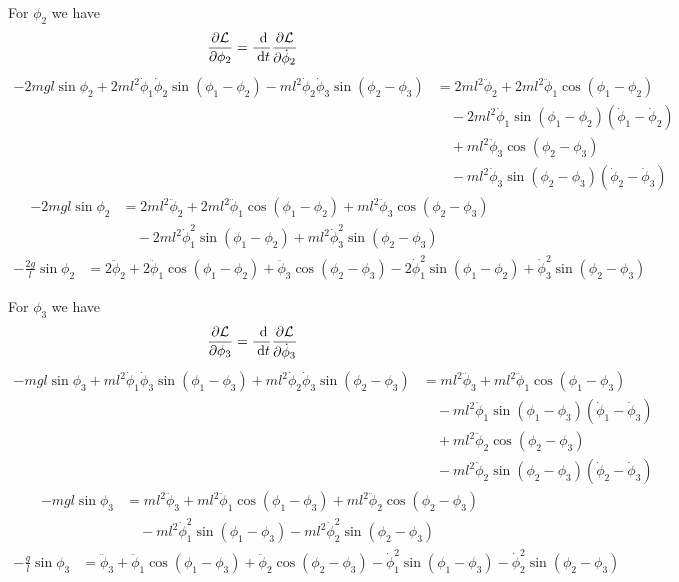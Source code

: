 \documentclass{article}
\renewcommand{\L}{\mathcal{L}}
\begin{document}
\begin{appendices}
For $\phi_2$ we have
\begin{align}
	\pD{\L}{\phi_2} &= \D{}{t}\pD{\L}{\dot\phi_2} 
\end{align}
\begin{align}
	-2mgl\sin\phi_2 +2ml^2\dot\phi_1\dot\phi_2\sin(\phi_1-\phi_2)
		-ml^2\dot\phi_2\dot\phi_3\sin(\phi_2-\phi_3)
	&= 2ml^2\ddot\phi_2 + 2ml^2\ddot\phi_1\cos(\phi_1-\phi_2) \\
	&\quad - 2ml^2\dot\phi_1\sin(\phi_1-\phi_2)(\dot\phi_1-\dot\phi_2) \\
	&\quad + ml^2\ddot\phi_3\cos(\phi_2-\phi_3) \\
	&\quad - ml^2\dot\phi_3\sin(\phi_2-\phi_3)(\dot\phi_2-\dot\phi_3) 
\end{align}
\begin{align}
	-2mgl\sin\phi_2 &= 2ml^2\ddot\phi_2 + 2ml^2\ddot\phi_1\cos(\phi_1-\phi_2)
		+ ml^2\ddot\phi_3\cos(\phi_2-\phi_3)  \\
		&\quad - 2ml^2\dot\phi_1^2\sin(\phi_1-\phi_2)
		+ ml^2\dot\phi_3^2\sin(\phi_2-\phi_3)
\end{align}
\begin{align}
	-\frac{2g}{l}\sin\phi_2 &= 2\ddot\phi_2 + 2\ddot\phi_1\cos(\phi_1-\phi_2)
		+ \ddot\phi_3\cos(\phi_2-\phi_3) - 2\dot\phi_1^2\sin(\phi_1-\phi_2)
		+ \dot\phi_3^2\sin(\phi_2-\phi_3)   \label{eq_m2}
\end{align}

For $\phi_3$ we have
\begin{align}
	\pD{\L}{\phi_3} &= \D{}{t}\pD{\L}{\dot\phi_3} 
\end{align}
\begin{align}
	-mgl\sin\phi_3 +ml^2\dot\phi_1\dot\phi_3\sin(\phi_1-\phi_3)
		+ml^2\dot\phi_2\dot\phi_3\sin(\phi_2-\phi_3)
	&= ml^2\ddot\phi_3 + ml^2\ddot\phi_1\cos(\phi_1-\phi_3) \\
	&\quad - ml^2\dot\phi_1\sin(\phi_1-\phi_3)(\dot\phi_1-\dot\phi_3) \\
	&\quad + ml^2\ddot\phi_2\cos(\phi_2-\phi_3) \\
	&\quad - ml^2\dot\phi_2\sin(\phi_2-\phi_3)(\dot\phi_2-\dot\phi_3) 
\end{align}
\begin{align}
	-mgl\sin\phi_3 &= ml^2\ddot\phi_3 + ml^2\ddot\phi_1\cos(\phi_1-\phi_3)
		+ ml^2\ddot\phi_2\cos(\phi_2-\phi_3)  \\
		&\quad - ml^2\dot\phi_1^2\sin(\phi_1-\phi_3)
		- ml^2\dot\phi_2^2\sin(\phi_2-\phi_3)
\end{align}
\begin{align}
	-\frac{g}{l}\sin\phi_3 &= \ddot\phi_3 + \ddot\phi_1\cos(\phi_1-\phi_3)
		+ \ddot\phi_2\cos(\phi_2-\phi_3) - \dot\phi_1^2\sin(\phi_1-\phi_3)
		- \dot\phi_2^2\sin(\phi_2-\phi_3)   \label{eq_m3}
\end{align}



\end{appendices}
\end{document}

